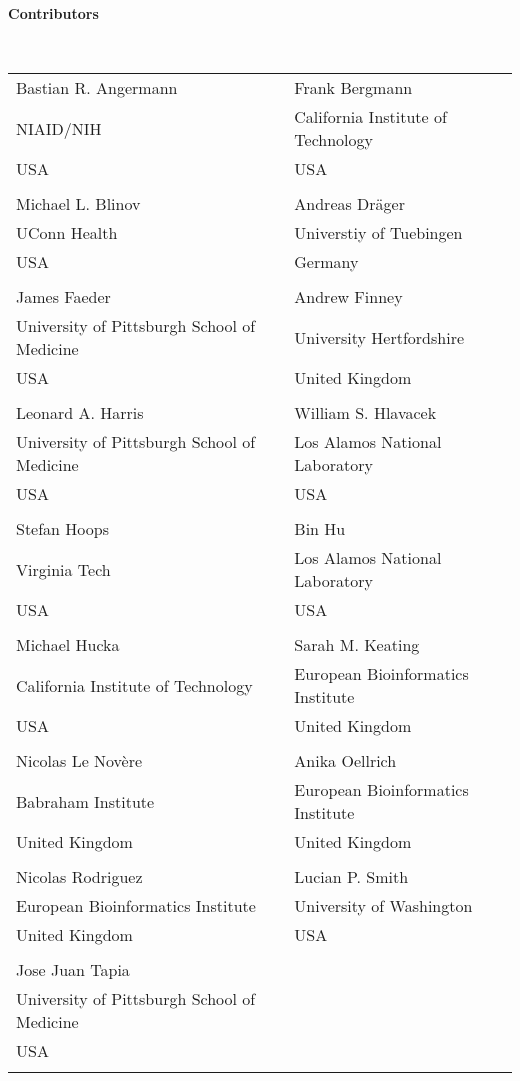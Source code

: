 
\begin{large}\textbf{Contributors}\end{large} \\
\begin{center}
  \begin{tabular}{l @{\hspace{20 pt}} l}
  Bastian R. Angermann				& Frank Bergmann \\[0.25em]
  NIAID/NIH		     			& California Institute of Technology \\
  USA						& USA \\
  \\
  Michael L. Blinov			   	& Andreas Dr\"ager \\[0.25em]
  UConn Health  	& Universtiy of Tuebingen \\
  USA     				   	& Germany \\
  \\
  James Faeder 					& Andrew Finney \\[0.25em]
  University of Pittsburgh School of Medicine	& University Hertfordshire \\
  USA						& United Kingdom \\
  \\
  Leonard A. Harris 				& William S. Hlavacek \\[0.25em]
  University of Pittsburgh School of Medicine	& Los Alamos National Laboratory \\
  USA						& USA\\
  \\
  Stefan Hoops 					& Bin Hu \\[0.25em]
  Virginia Tech 				& Los Alamos National Laboratory \\
  USA	 					& USA \\
  \\
  Michael Hucka 				& Sarah M. Keating\\[0.25em]
  California Institute of Technology		& European Bioinformatics Institute \\
  USA						& United Kingdom \\
  \\
  Nicolas Le Nov\`ere				& Anika Oellrich \\[0.25em]
  Babraham Institute				& European Bioinformatics Institute \\
  United Kingdom				& United Kingdom \\
  \\
  Nicolas Rodriguez 				& Lucian P. Smith \\[0.25em]
  European Bioinformatics Institute		& University of Washington\\
  United Kingdom				& USA\\
  \\
  Jose Juan Tapia				& \\[0.25em]
  University of Pittsburgh School of Medicine	& \\
  USA						& \\
  \\
  \end{tabular}
\end{center}
  
